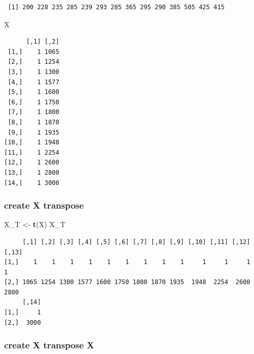 \documentclass[]{book}
\newenvironment{Shaded}{\begin{snugshade}}{\end{snugshade}}
\newcommand{\KeywordTok}[1]{\textcolor[rgb]{0.13,0.29,0.53}{\textbf{#1}}}
\newcommand{\NormalTok}[1]{#1}
\newcommand{\OperatorTok}[1]{\textcolor[rgb]{0.81,0.36,0.00}{\textbf{#1}}}
\newcommand{\StringTok}[1]{\textcolor[rgb]{0.31,0.60,0.02}{#1}}
\begin{document}
\begin{verbatim}
 [1] 200 228 235 285 239 293 285 365 295 290 385 505 425 415
\end{verbatim}

\begin{Shaded}
\begin{Highlighting}[]
\NormalTok{X}
\end{Highlighting}
\end{Shaded}

\begin{verbatim}
      [,1] [,2]
 [1,]    1 1065
 [2,]    1 1254
 [3,]    1 1300
 [4,]    1 1577
 [5,]    1 1600
 [6,]    1 1750
 [7,]    1 1800
 [8,]    1 1870
 [9,]    1 1935
[10,]    1 1948
[11,]    1 2254
[12,]    1 2600
[13,]    1 2800
[14,]    1 3000
\end{verbatim}

\hypertarget{create-x-transpose}{%
\subsubsection{create X transpose}\label{create-x-transpose}}

\begin{Shaded}
\begin{Highlighting}[]
\NormalTok{X_T <-}\StringTok{ }\KeywordTok{t}\NormalTok{(X)}
\NormalTok{X_T}
\end{Highlighting}
\end{Shaded}

\begin{verbatim}
     [,1] [,2] [,3] [,4] [,5] [,6] [,7] [,8] [,9] [,10] [,11] [,12] [,13]
[1,]    1    1    1    1    1    1    1    1    1     1     1     1     1
[2,] 1065 1254 1300 1577 1600 1750 1800 1870 1935  1948  2254  2600  2800
     [,14]
[1,]     1
[2,]  3000
\end{verbatim}

\hypertarget{create-x-transpose-x}{%
\subsubsection{create X transpose X}\label{create-x-transpose-x}}

\begin{Shaded}
\end{Shaded}
\end{document}
